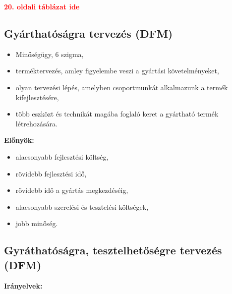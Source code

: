 \documentclass[11pt]{article}
\begin{document}
			\textbf{\textcolor{red}{20. oldali táblázat ide}}

		\subsection{Gyárthatóságra tervezés (DFM)}

			\begin{itemize}
				\item Minőségügy, 6 szigma,
				\item terméktervezés, amley figyelembe veszi a gyártási követelményeket, 
				\item olyan tervezési lépés, amelyben csoportmunkát alkalmazunk a termék kifejlesztésére,
				\item több eszközt és technikát magába foglaló keret a gyártható termék létrehozására.
			\end{itemize}

			\textbf{Előnyök:}

			\begin{itemize}
				\item alacsonyabb fejlesztési költség,
				\item rövidebb fejlesztési idő, 
				\item rövidebb idő a gyártás megkezdéséig,
				\item alacsonyabb szerelési és tesztelési költségek, 
				\item jobb minőség.
			\end{itemize}

		\subsection{Gyráthatóságra, tesztelhetőségre tervezés (DFM)}

			\textbf{Irányelvek:}
\end{document}
